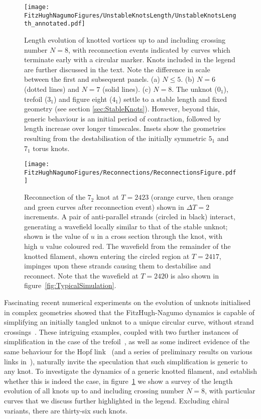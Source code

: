\begin{figure}[htbp]
\centering
    \texttt{[image: \\FitzHughNagumoFigures/UnstableKnotsLength/UnstableKnotsLength\_annotated.pdf]}
    \caption[Length evolution of knotted vortices up to and including crossing number eight.]{ Length evolution of knotted vortices up to and including crossing number $N=8$, with reconnection events indicated by curves which terminate early with a circular marker. Knots included in the legend are further discussed in the text. Note the difference in scale between the first and subsequent panels. (a) $N\leq5$. (b) $N=6$ (dotted lines) and $N=7$ (solid lines). (c) $N=8$. The unknot ($0_1$), trefoil ($3_1$) and figure eight ($4_1$) settle to a stable length and fixed geometry (see section \ref{sec:StableKnots}). However, beyond this, generic behaviour is an initial period of contraction, followed by length increase over longer timescales. Insets show the geometries resulting from the destabilisation of the initially symmetric $5_1$ and $7_1$ torus knots.} 
\label{fig:UnstableKnotsLength}
\end{figure}

\begin{figure}[htbp]
\centering
    \texttt{[image: \\FitzHughNagumoFigures/Reconnections/ReconnectionsFigure.pdf]}
    \caption[Reconnection of the $7_2$ knot.]{Reconnection of the $7_2$ knot at $T=2423$ (orange curve, then orange and green curves after reconnection event) shown in $\Delta T = 2$ increments. A pair of anti-parallel strands (circled in black) interact, generating a wavefield locally similar to that of the stable unknot; shown is the value of $u$ in a cross section through the knot, with high $u$ value coloured red. The wavefield from the remainder of the knotted filament, shown entering the circled region at $T=2417$, impinges upon these strands causing them to destabilise and reconnect. Note that the wavefield at $T=2420$ is also shown in figure~\ref{fig:TypicalSimulation}.}
\label{fig:Reconnections}
\end{figure}

Fascinating recent numerical experiments on the evolution of unknots initialised in complex geometries showed that the FitzHugh-Nagumo dynamics is capable of simplifying an initially tangled unknot to a unique circular curve, without strand crossings~\citep{Maucher2016}. These intriguing examples, coupled with two further instances of simplification in the case of the trefoil~\citep{Sutcliffe2003}, as well as some indirect evidence of the same behaviour for the Hopf link~\citep{Maucher2019} (and a series of preliminary results on various links in~\citep{Henze1993}), naturally invite the speculation that such simplification is generic to any knot. To investigate the dynamics of a generic knotted filament, and establish whether this is indeed the case, in figure~\ref{fig:UnstableKnotsLength} we show a survey of the length evolution of all knots up to and including crossing number $N=8$, with particular curves that we discuss further highlighted in the legend. Excluding chiral variants, there are thirty-six such knots. 

